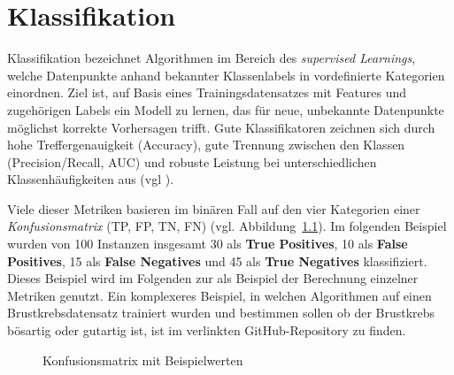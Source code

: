 \chapter{Klassifikation}

Klassifikation bezeichnet Algorithmen im Bereich des \emph{supervised
Learnings}, welche Datenpunkte anhand bekannter Klassenlabels in vordefinierte
Kategorien einordnen. Ziel ist, auf Basis eines Trainingsdatensatzes mit
Features und zugehörigen Labels ein Modell zu lernen, das für neue, unbekannte
Datenpunkte möglichst korrekte Vorhersagen trifft. Gute Klassifikatoren
zeichnen sich durch hohe Treffergenauigkeit (Accuracy), gute Trennung
zwischen den Klassen (Precision/Recall, AUC) und robuste Leistung bei
unterschiedlichen Klassenhäufigkeiten aus (vgl \cite{Miller2024}).

Viele dieser Metriken basieren im binären Fall auf den vier Kategorien einer
\emph{Konfusionsmatrix} (\ac{TP}, \ac{FP}, \ac{TN}, \ac{FN})
(vgl. Abbildung~\ref{fig:confmat}). Im folgenden Beispiel wurden von 100 Instanzen
insgesamt 30 als \textbf{True Positives}, 10 als \textbf{False Positives}, 15 als \textbf{False Negatives}
und 45 als \textbf{True Negatives} klassifiziert. Dieses Beispiel wird im Folgenden zur als Beispiel
der Berechnung einzelner Metriken genutzt.
Ein komplexeres Beispiel, in welchen Algorithmen auf einen Brustkrebsdatensatz trainiert wurden und bestimmen sollen ob der 
Brustkrebs bösartig oder gutartig ist, ist im verlinkten GitHub-Repository zu finden.

\begin{figure}[ht]
  \centering
  \caption{Konfusionsmatrix mit Beispielwerten}
  \label{fig:confmat}
\end{figure}

